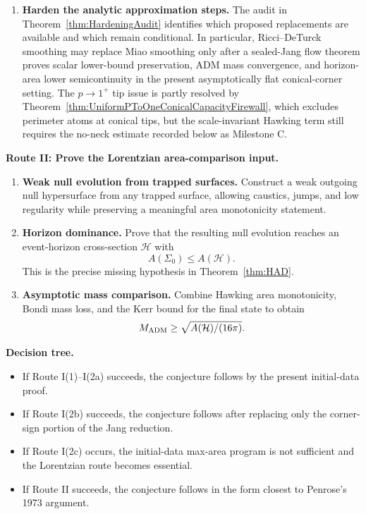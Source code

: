 \begin{enumerate}
    \item \textbf{Harden the analytic approximation steps.} The audit in
    Theorem~\ref{thm:HardeningAudit} identifies which proposed replacements
    are available and which remain conditional.  In particular, Ricci--DeTurck
    smoothing may replace Miao smoothing only after a sealed-Jang flow theorem
    proves scalar lower-bound preservation, ADM mass convergence, and
    horizon-area lower semicontinuity in the present asymptotically flat
    conical-corner setting.  The \(p\to1^+\) tip issue is partly resolved by
    Theorem~\ref{thm:UniformPToOneConicalCapacityFirewall}, which excludes
    perimeter atoms at conical tips, but the scale-invariant Hawking term still
    requires the no-neck estimate recorded below as Milestone C.
\end{enumerate}

\textbf{Route II: Prove the Lorentzian area-comparison input.}
\begin{enumerate}
    \item \textbf{Weak null evolution from trapped surfaces.} Construct a weak outgoing null hypersurface from any trapped surface, allowing caustics, jumps, and low regularity while preserving a meaningful area monotonicity statement.
    \item \textbf{Horizon dominance.} Prove that the resulting null evolution reaches an event-horizon cross-section $\mathcal H$ with
    \[
        A(\Sigma_0)\le A(\mathcal H).
    \]
    This is the precise missing hypothesis in Theorem~\ref{thm:HAD}.
    \item \textbf{Asymptotic mass comparison.} Combine Hawking area monotonicity, Bondi mass loss, and the Kerr bound for the final state to obtain
    \[
        M_{\mathrm{ADM}}\ge \sqrt{A(\mathcal H)/(16\pi)}.
    \]
\end{enumerate}

\textbf{Decision tree.}
\begin{itemize}
    \item If Route I(1)--I(2a) succeeds, the conjecture follows by the present initial-data proof.
    \item If Route I(2b) succeeds, the conjecture follows after replacing only the corner-sign portion of the Jang reduction.
    \item If Route I(2c) occurs, the initial-data max-area program is not sufficient and the Lorentzian route becomes essential.
    \item If Route II succeeds, the conjecture follows in the form closest to Penrose's 1973 argument.
\end{itemize}

